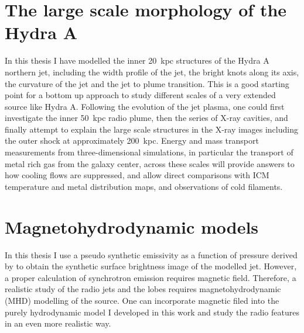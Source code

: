 \section{The large scale morphology of the Hydra A}
In this thesis I have modelled the inner 20~kpc structures of the Hydra A northern jet, including the width profile of the jet, the bright knots along its axis, the curvature of the jet and the jet to plume transition. This is a good starting point for a bottom up approach to study different scales of a very extended source like Hydra A. Following the evolution of the jet plasma, one could first investigate the inner 50~kpc radio plume, then the series of X-ray cavities, and finally attempt to explain the large scale structures in the X-ray images including the outer shock at approximately 200~kpc. Energy and mass transport measurements from three-dimensional simulations, in particular the transport of metal rich gas from the galaxy center, across these scales will provide answers to how cooling flows are suppressed, and allow direct comparisons with ICM temperature and metal distribution maps, and observations of cold filaments.


\section{Magnetohydrodynamic models} 
In this thesis I use a pseudo synthetic emissivity as a function of pressure derived by \citep{sutherland07} to obtain the synthetic surface brightness image of the modelled jet. However, a proper calculation of synchrotron emission requires magnetic field. Therefore, a realistic study of the radio jets and the lobes requires magnetohydrodynamic (MHD) modelling of the source. One can incorporate magnetic filed into the purely hydrodynamic model I developed in this work and study the radio features in an even more realistic way.

